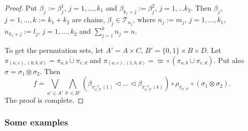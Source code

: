 \documentclass[12pt]{article}
\theoremstyle{definition}
\theoremstyle{remark}
\def\Te{\mathcal T}
\def\vtl{\vartriangleleft}
\begin{document}
\begin{proof}
Put  $\beta_j:=\beta^1_j$, $j=1,\dots, k_1$ and $\beta_{k_1+j}:=\beta^2_j$, $j=1,\dots
k_2$. Then $\beta_j$, $j=1,\dots,k:= k_1+k_2$ are chains, $\beta_j\in \Te_{n_j}$, where
$n_j:= m_j$, $j=1,\dots,k_1$, $n_{k_1+j}:=l_j$, $j=1,\dots,k_2$ and $\sum_{j=1}^k n_j=n$. 

To get the permutation sets, let $A'=A\times C$, $B'=\{0,1\}\times B\times D$. 
Let $\pi_{(a,c), (0,b,d)}=\pi_{a,b}\dot{\cup} \pi_{c,d}$ and $\pi_{(a,c),
(1,b,d)}=\varpi\circ (\pi_{a,b}\dot{\cup} \pi_{c,d})$. Put also $\sigma=\sigma_1\otimes
\sigma_2$. Then   
\[
f=\bigvee_{a'\in A'} \bigwedge_{b'\in B'}(\beta_{\pi^{-1}_{a',b'}(1)}\vtl \dots \vtl
\beta_{\pi^{-1}_{a',b'}(k)}) \circ \rho_{\pi_{a',b'}}\circ
(\sigma_1\otimes \sigma_2).
\]
The proof is complete.



\end{proof}



\subsubsection{Some examples}
\end{document}
